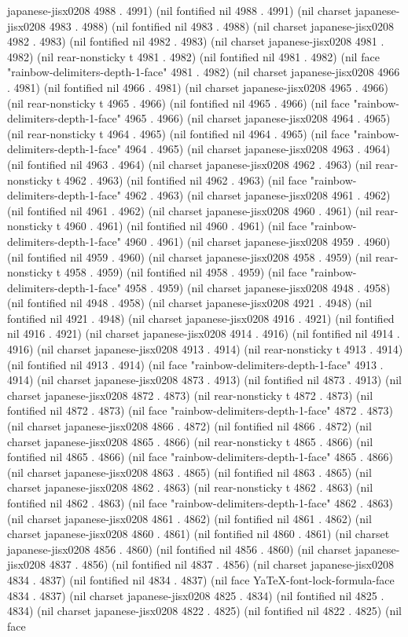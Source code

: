 japanese-jisx0208 4988 . 4991) (nil fontified nil 4988 . 4991) (nil charset japanese-jisx0208 4983 . 4988) (nil fontified nil 4983 . 4988) (nil charset japanese-jisx0208 4982 . 4983) (nil fontified nil 4982 . 4983) (nil charset japanese-jisx0208 4981 . 4982) (nil rear-nonsticky t 4981 . 4982) (nil fontified nil 4981 . 4982) (nil face "rainbow-delimiters-depth-1-face" 4981 . 4982) (nil charset japanese-jisx0208 4966 . 4981) (nil fontified nil 4966 . 4981) (nil charset japanese-jisx0208 4965 . 4966) (nil rear-nonsticky t 4965 . 4966) (nil fontified nil 4965 . 4966) (nil face "rainbow-delimiters-depth-1-face" 4965 . 4966) (nil charset japanese-jisx0208 4964 . 4965) (nil rear-nonsticky t 4964 . 4965) (nil fontified nil 4964 . 4965) (nil face "rainbow-delimiters-depth-1-face" 4964 . 4965) (nil charset japanese-jisx0208 4963 . 4964) (nil fontified nil 4963 . 4964) (nil charset japanese-jisx0208 4962 . 4963) (nil rear-nonsticky t 4962 . 4963) (nil fontified nil 4962 . 4963) (nil face "rainbow-delimiters-depth-1-face" 4962 . 4963) (nil charset japanese-jisx0208 4961 . 4962) (nil fontified nil 4961 . 4962) (nil charset japanese-jisx0208 4960 . 4961) (nil rear-nonsticky t 4960 . 4961) (nil fontified nil 4960 . 4961) (nil face "rainbow-delimiters-depth-1-face" 4960 . 4961) (nil charset japanese-jisx0208 4959 . 4960) (nil fontified nil 4959 . 4960) (nil charset japanese-jisx0208 4958 . 4959) (nil rear-nonsticky t 4958 . 4959) (nil fontified nil 4958 . 4959) (nil face "rainbow-delimiters-depth-1-face" 4958 . 4959) (nil charset japanese-jisx0208 4948 . 4958) (nil fontified nil 4948 . 4958) (nil charset japanese-jisx0208 4921 . 4948) (nil fontified nil 4921 . 4948) (nil charset japanese-jisx0208 4916 . 4921) (nil fontified nil 4916 . 4921) (nil charset japanese-jisx0208 4914 . 4916) (nil fontified nil 4914 . 4916) (nil charset japanese-jisx0208 4913 . 4914) (nil rear-nonsticky t 4913 . 4914) (nil fontified nil 4913 . 4914) (nil face "rainbow-delimiters-depth-1-face" 4913 . 4914) (nil charset japanese-jisx0208 4873 . 4913) (nil fontified nil 4873 . 4913) (nil charset japanese-jisx0208 4872 . 4873) (nil rear-nonsticky t 4872 . 4873) (nil fontified nil 4872 . 4873) (nil face "rainbow-delimiters-depth-1-face" 4872 . 4873) (nil charset japanese-jisx0208 4866 . 4872) (nil fontified nil 4866 . 4872) (nil charset japanese-jisx0208 4865 . 4866) (nil rear-nonsticky t 4865 . 4866) (nil fontified nil 4865 . 4866) (nil face "rainbow-delimiters-depth-1-face" 4865 . 4866) (nil charset japanese-jisx0208 4863 . 4865) (nil fontified nil 4863 . 4865) (nil charset japanese-jisx0208 4862 . 4863) (nil rear-nonsticky t 4862 . 4863) (nil fontified nil 4862 . 4863) (nil face "rainbow-delimiters-depth-1-face" 4862 . 4863) (nil charset japanese-jisx0208 4861 . 4862) (nil fontified nil 4861 . 4862) (nil charset japanese-jisx0208 4860 . 4861) (nil fontified nil 4860 . 4861) (nil charset japanese-jisx0208 4856 . 4860) (nil fontified nil 4856 . 4860) (nil charset japanese-jisx0208 4837 . 4856) (nil fontified nil 4837 . 4856) (nil charset japanese-jisx0208 4834 . 4837) (nil fontified nil 4834 . 4837) (nil face YaTeX-font-lock-formula-face 4834 . 4837) (nil charset japanese-jisx0208 4825 . 4834) (nil fontified nil 4825 . 4834) (nil charset japanese-jisx0208 4822 . 4825) (nil fontified nil 4822 . 4825) (nil face 